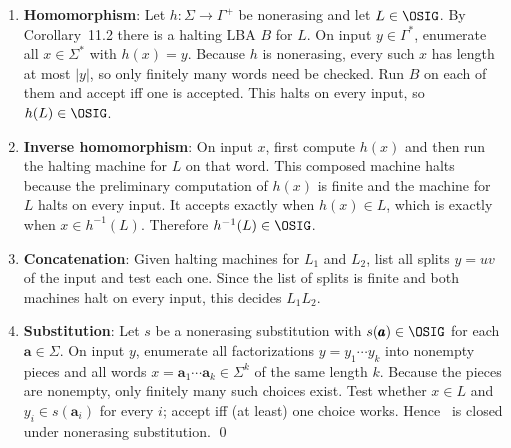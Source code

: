 \begin{enumerate}[{11.}1. ]
\begin{enumerate}
\item \textbf{Homomorphism}: Let $h:\Sigma\to\Gamma^+$ be nonerasing and let
$L\in\OSIG$. By Corollary~11.2 there is a halting LBA $B$ for $L$. On input
$y\in\Gamma^*$, enumerate all $x\in\Sigma^*$ with $h(x)=y$. Because $h$ is
nonerasing, every such $x$ has length at most $|y|$, so only finitely many words
need be checked. Run $B$ on each of them and accept iff one is accepted. This
halts on every input, so $h(L)\in\OSIG$.

\item \textbf{Inverse homomorphism}: On input $x$, first compute $h(x)$ and then
run the halting machine for $L$ on that word. This composed machine halts because
the preliminary computation of $h(x)$ is finite and the machine for $L$ halts on
every input. It accepts exactly when $h(x)\in L$, which is exactly when
$x\in h^{-1}(L)$. Therefore $h^{-1}(L)\in\OSIG$.

\item \textbf{Concatenation}: Given halting machines for $L_1$ and $L_2$, list all
splits $y=uv$ of the input and test each one. Since the list of splits is finite
and both machines halt on every input, this decides $L_1L_2$.

\item \textbf{Substitution}: Let $s$ be a nonerasing substitution with
$s(\pmb{a})\in\OSIG$ for each $\pmb{a}\in\Sigma$. On input $y$, enumerate all
factorizations $y=y_1\cdots y_k$ into nonempty pieces and all words
$x=\pmb{a}_1\cdots\pmb{a}_k\in\Sigma^k$ of the same length $k$. Because the pieces are
nonempty, only finitely many such choices exist. Test whether $x\in L$ and
$y_i\in s(\pmb{a}_i)$ for every $i$; accept iff (at least) one choice works. Hence
\OSIG\ is closed under nonerasing substitution. \qed
\end{enumerate}

\end{enumerate}
